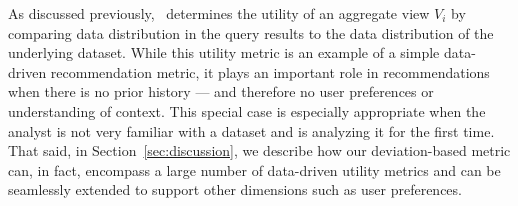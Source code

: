 




As discussed previously, \SeeDB\ determines the utility of an aggregate view $V_i$ by
comparing data distribution in the query results to the data distribution of the underlying dataset.
While this utility metric is an example of a simple data-driven recommendation metric,
it plays an important role in recommendations when 
there is no prior history --- and therefore no user preferences
or understanding of context.
This special case is especially appropriate when the analyst
is not very familiar with a dataset and is analyzing it for the first time.
That said, in Section~\ref{sec:discussion}, we describe how our deviation-based
metric can, in fact, encompass a large number of data-driven utility metrics and
can be seamlessly extended to support other dimensions such as user preferences.

